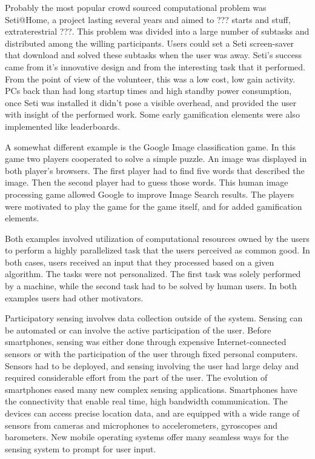 \documentclass[conference,letterpaper]{IEEEtran}
\begin{document}
Probably the most popular crowd sourced computational problem was Seti@Home, a project lasting several years and aimed to ??? starts and stuff, extraterestrial ???. This problem was divided into a large number of subtasks and distributed among the willing participants. Users could set a Seti screen-saver that download and solved these subtasks when the user was away. Seti's success came from it's innovative design and from the interesting task that it performed. From the point of view of the volunteer, this was a low cost, low gain activity. PCs back than had long startup times and high standby power consumption, once Seti was installed it didn't pose a visible overhead, and provided the user with insight of the performed work. Some early gamification elements were also implemented like leaderboards.

A somewhat different example is the Google Image classification game. In this game two players cooperated to solve a simple puzzle. An image was displayed in both player's browsers. The first player had to find five words that described the image. Then the second player had to guess those words. This human image processing game allowed Google to improve Image Search results. The players were motivated to play the game for the game itself, and for added gamification elements.

Both examples involved utilization of computational resources owned by the users to perform a highly parallelized task that the users perceived as common good. In both cases, users received an input that they processed based on a given algorithm. The tasks were not personalized. The first task was solely performed by a machine, while the second task had to be solved by human users. In both examples users had other motivators.

Participatory sensing involves data collection outside of the system. Sensing can be automated or can involve the active participation of the user. Before smartphones, sensing was either done through expensive Internet-connected sensors or with the participation of the user through fixed personal computers. Sensors had to be deployed, and sensing involving the user had large delay and required considerable effort from the part of the user. The evolution of smartphones eased many new complex sensing applications. Smartphones have the connectivity that enable real time, high bandwidth communication. The devices can access precise location data, and are equipped with a wide range of sensors from cameras and microphones to accelerometers, gyroscopes and barometers. New mobile operating systems offer many seamless ways for the sensing system to prompt for user input.
\end{document}
